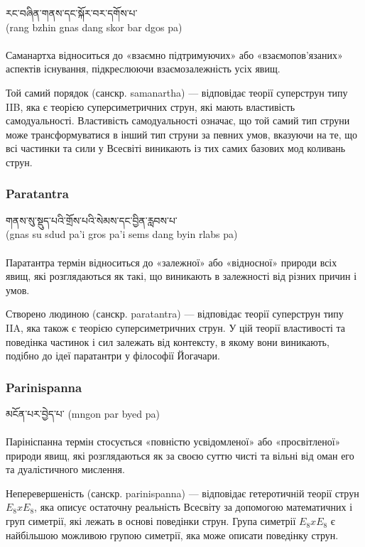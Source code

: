 \ti རང་བཞིན་གནས་དང་སྐོར་བར་དགོས་པ་ 
\\
\ua (rang bzhin gnas dang skor bar dgos pa)\\
\\
Саманартха відноситься до «взаємно підтримуючих» або «взаємопов'язаних»
аспектів існування, підкреслюючи взаємозалежність усіх явищ.

Той самий порядок (санскр. samanartha) — відповідає теорії суперструн типу IIB,
яка є теорією суперсиметричних струн, які мають властивість самодуальності.
Властивість самодуальності означає, що той самий тип струни може трансформуватися
в інший тип струни за певних умов, вказуючи на те, що всі частинки та сили у
Всесвіті виникають із тих самих базових мод коливань струн.

\subsubsection*{Paratantra}

\ti གནས་སུ་སྡུད་པའི་གྲོས་པའི་སེམས་དང་བྱིན་རླབས་པ་  
\\
\ua (gnas su sdud pa'i gros pa'i sems dang byin rlabs pa)\\
\\
Паратантра термін відноситься до «залежної» або «відносної» природи всіх явищ,
які розглядаються як такі, що виникають в залежності від різних причин і умов.

Створено людиною (санскр. paratantra) --- відповідає теорії суперструн типу IIA,
яка також є теорією суперсиметричних струн. У цій теорії властивості та поведінка
частинок і сил залежать від контексту, в якому вони виникають, подібно до ідеї
паратантри у філософії Йогачари.

\newpage
\subsubsection*{Parinispanna}

\ti མངོན་པར་བྱེད་པ་  \ua (mngon par byed pa)\\
\\
Парініспанна термін стосується «повністю усвідомленої» або «просвітленої» природи
явищ, які розглядаються як за своєю суттю чисті та вільні від оман его та
дуалістичного мислення.

Неперевершеність (санскр. parinispanna) --- відповідає гетеротичній теорії струн $E_8 x E_8$,
яка описує остаточну реальність Всесвіту за допомогою математичних і груп симетрії, які
лежать в основі поведінки струн. Група симетрії $E_8 x E_8$ є найбільшою можливою групою симетрії,
яка може описати поведінку струн.

